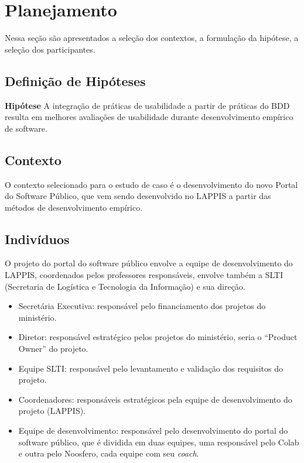 \section{Planejamento}
Nessa seção são apresentados a seleção dos contextos, a formulação da hipótese, a seleção dos participantes.

\subsection{Definição de Hipóteses}

\textbf{Hipótese}  A integração de práticas de usabilidade a partir de práticas do BDD resulta em melhores avaliações de usabilidade durante desenvolvimento empírico de software.

\subsection{Contexto}

O contexto selecionado para o estudo de caso é o desenvolvimento do novo Portal do Software Público, que vem sendo desenvolvido no LAPPIS a partir das métodos de desenvolvimento empírico.		

\subsection{Indivíduos}

O projeto do portal do software público envolve a equipe de desenvolvimento do LAPPIS, coordenados pelos professores responsáveis, envolve também a SLTI (Secretaria de Logística e Tecnologia da Informação) e sua direção.

\begin{itemize}

\item Secretária Executiva: responsável pelo financiamento dos projetos do ministério.

\item Diretor: responsável estratégico pelos projetos do ministério, seria o ``Product Owner'' do projeto.

\item Equipe SLTI: responsável pelo levantamento e validação dos requisitos do projeto.

\item Coordenadores: responsáveis estratégicos pela equipe de desenvolvimento do projeto (LAPPIS).

\item Equipe de desenvolvimento: responsável pelo desenvolvimento do portal do software público, que é dividida em duas equipes, uma responsável pelo Colab e outra pelo Noosfero, cada equipe com seu \textit{coach}.

\end{itemize}

